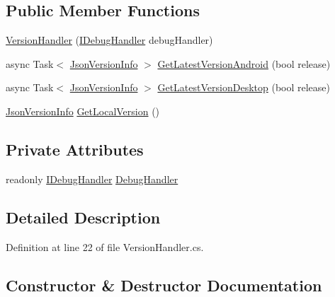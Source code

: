 \subsection*{Public Member Functions}
\begin{DoxyCompactItemize}
\item 
\mbox{\hyperlink{class_little_weeb_library_1_1_handlers_1_1_version_handler_a51b31c85fe764e675c800d75b668f5d4}{Version\+Handler}} (\mbox{\hyperlink{interface_little_weeb_library_1_1_handlers_1_1_i_debug_handler}{I\+Debug\+Handler}} debug\+Handler)
\item 
async Task$<$ \mbox{\hyperlink{class_little_weeb_library_1_1_models_1_1_json_version_info}{Json\+Version\+Info}} $>$ \mbox{\hyperlink{class_little_weeb_library_1_1_handlers_1_1_version_handler_a4021041fcc24a7f9489060c598222891}{Get\+Latest\+Version\+Android}} (bool release)
\item 
async Task$<$ \mbox{\hyperlink{class_little_weeb_library_1_1_models_1_1_json_version_info}{Json\+Version\+Info}} $>$ \mbox{\hyperlink{class_little_weeb_library_1_1_handlers_1_1_version_handler_ad4dc752be10a1b3cc2d546dc1d4d6bff}{Get\+Latest\+Version\+Desktop}} (bool release)
\item 
\mbox{\hyperlink{class_little_weeb_library_1_1_models_1_1_json_version_info}{Json\+Version\+Info}} \mbox{\hyperlink{class_little_weeb_library_1_1_handlers_1_1_version_handler_ac2510dcad764a9c925d8da152740f095}{Get\+Local\+Version}} ()
\end{DoxyCompactItemize}
\subsection*{Private Attributes}
\begin{DoxyCompactItemize}
\item 
readonly \mbox{\hyperlink{interface_little_weeb_library_1_1_handlers_1_1_i_debug_handler}{I\+Debug\+Handler}} \mbox{\hyperlink{class_little_weeb_library_1_1_handlers_1_1_version_handler_a9d4e181ca6b1efff96f530dd7981d6e3}{Debug\+Handler}}
\end{DoxyCompactItemize}


\subsection{Detailed Description}


Definition at line 22 of file Version\+Handler.\+cs.



\subsection{Constructor \& Destructor Documentation}
\mbox{\label{class_little_weeb_library_1_1_handlers_1_1_version_handler_a51b31c85fe764e675c800d75b668f5d4}} 
